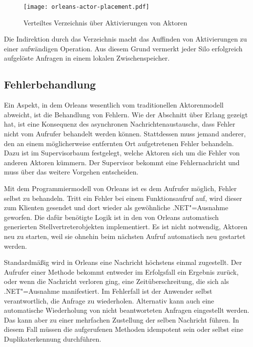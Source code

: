 \begin{figure}[!hbt]%
\texttt{[image: orleans-actor-placement.pdf]}%
\caption{Verteiltes Verzeichnis über Aktivierungen von Aktoren}%
\label{fig:orleans-acor-placement}%
\end{figure}

Die Indirektion durch das Verzeichnis macht das Auffinden von Aktivierungen zu einer aufwändigen Operation. Aus diesem Grund vermerkt jeder Silo erfolgreich aufgelöste Anfragen in einem lokalen Zwischenspeicher.

\subsection{Fehlerbehandlung}

Ein Aspekt, in dem Orleans wesentlich vom traditionellen Aktorenmodell abweicht, ist die Behandlung von Fehlern. Wie der Abschnitt über Erlang gezeigt hat, ist eine Konsequenz des asynchronen Nachrichtenaustauschs, dass Fehler nicht vom Aufrufer behandelt werden können. Stattdessen muss jemand anderer, den an einem möglicherweise entfernten Ort aufgetretenen Fehler behandeln. Dazu ist im Supervisorbaum festgelegt, welche Aktoren sich um die Fehler von anderen Aktoren kümmern. Der Supervisor bekommt eine Fehlernachricht und muss über das weitere Vorgehen entscheiden.

Mit dem Programmiermodell von Orleans ist es dem Aufrufer möglich, Fehler selbst zu behandeln. Tritt ein Fehler bei einem Funktionsaufruf auf, wird dieser zum Klienten gesendet und dort wieder als gewöhnliche .NET"=Ausnahme geworfen. Die dafür benötigte Logik ist in den von Orleans automatisch generierten Stellvertreterobjekten implementiert. Es ist nicht notwendig, Aktoren neu zu starten, weil sie ohnehin beim nächsten Aufruf automatisch neu gestartet werden.

Standardmäßig wird in Orleans eine Nachricht höchstens einmal zugestellt. Der Aufrufer einer Methode bekommt entweder im Erfolgsfall ein Ergebnis zurück, oder wenn die Nachricht verloren ging, eine Zeitüberschreitung, die sich als .NET"=Ausnahme manifestiert. Im Fehlerfall ist der Anwender selbst verantwortlich, die Anfrage zu wiederholen. Alternativ kann auch eine automatische Wiederholung von nicht beantworteten Anfragen eingestellt werden. Das kann aber zu einer mehrfachen Zustellung der selben Nachricht führen. In diesem Fall müssen die aufgerufenen Methoden idempotent sein oder selbst eine Duplikaterkennung durchführen.


